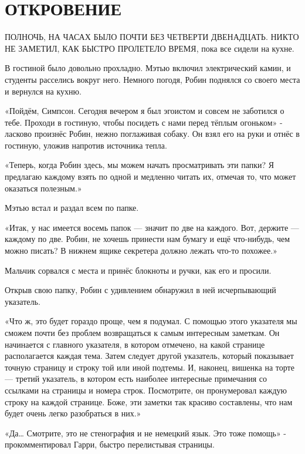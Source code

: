 \documentclass[a4paper,12pt]{book}
\begin{document}
\chapter{ОТКРОВЕНИЕ}
\noindent{} ПОЛНОЧЬ, НА ЧАСАХ БЫЛО ПОЧТИ БЕЗ ЧЕТВЕРТИ ДВЕНАДЦАТЬ. НИКТО НЕ ЗАМЕТИЛ, КАК БЫСТРО ПРОЛЕТЕЛО ВРЕМЯ, пока все сидели на кухне.\\
\par
В гостиной было довольно прохладно. Мэтью включил электрический камин, и студенты расселись вокруг него. Немного погодя, Робин поднялся со своего места и вернулся на кухню.
\par
«Пойдём, Симпсон. Сегодня вечером я был эгоистом и совсем не заботился о тебе. Проходи в гостиную, чтобы посидеть с нами перед тёплым огоньком» - ласково произнёс Робин, нежно поглаживая собаку. Он взял его на руки и отнёс в гостиную, уложив напротив источника тепла.\\
\par
«Теперь, когда Робин здесь, мы можем начать просматривать эти папки? Я предлагаю каждому взять по одной и медленно читать их, отмечая то, что может оказаться полезным.»
\par
Мэтью встал и раздал всем по папке.
\par
«Итак, у нас имеется восемь папок — значит по две на каждого. Вот, держите — каждому по две. Робин, не хочешь принести нам бумагу и ещё что-нибудь, чем можно писать? В нижнем ящике секретера должно лежать что-то похожее.»
\par
Мальчик сорвался с места и принёс блокноты и ручки, как его и просили.
\par
Открыв свою папку, Робин с удивлением обнаружил в ней исчерпывающий указатель.
\par
«Что ж, это будет гораздо проще, чем я подумал. С помощью этого указателя мы сможем почти без проблем возвращаться к самым интересным заметкам. Он начинается с главного указателя, в котором отмечено, на какой странице располагается каждая тема. Затем следует другой указатель, который показывает точную страницу и строку той или иной подтемы. И, наконец, вишенка на торте — третий указатель, в котором есть наиболее интересные примечания со ссылками на страницы и номера строк. Посмотрите, он пронумеровал каждую строку на каждой странице. Боже, эти заметки так красиво составлены, что нам будет очень легко разобраться в них.»
\par
«Да… Смотрите, это не стенография и не немецкий язык. Это тоже помощь» - прокомментировал Гарри, быстро перелистывая страницы.\\
\end{document}
